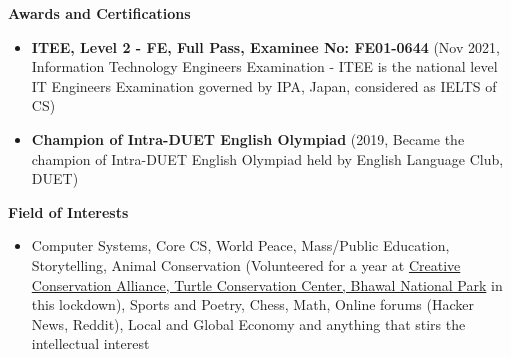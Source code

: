 \documentclass[legalpaper,10pt]{article}
\newcommand{\resheading}[1]{{\large \colorbox{mygrey}{\begin{minipage}{\textwidth}{\textbf{#1 \vphantom{p\^{E}}}}\end{minipage}}}}
\begin{document}
	\vspace{0.15in}
	
	\resheading{Awards and Certifications}
	\begin{itemize}
	
		\item \textbf{ITEE, Level 2 - FE, Full Pass, Examinee No: FE01-0644} (Nov 2021,  Information Technology Engineers Examination - ITEE is the national level IT Engineers Examination governed by IPA, Japan, considered as IELTS of CS) 
		
		\item \textbf{Champion of Intra-DUET English Olympiad} (2019, Became the champion of Intra-DUET English Olympiad held by English Language Club, DUET)

	\end{itemize}

	\vspace{0.15in}
	
	\resheading{Field of Interests}
		\begin{itemize}
			\item Computer Systems, Core CS,  World Peace, Mass/Public Education, Storytelling, Animal Conservation (Volunteered for a year at \url{} \href{https://www.instagram.com/creativeconservationalliance/}{Creative Conservation Alliance, Turtle Conservation Center, Bhawal National Park} in this lockdown), Sports and Poetry, Chess, Math, Online forums (Hacker News, Reddit), Local and Global Economy and anything that stirs the intellectual interest
		\end{itemize}
\end{document}
